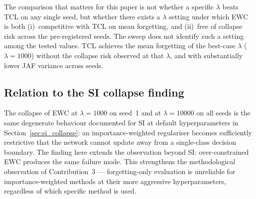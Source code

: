 The comparison that matters for this paper is not whether a specific
$\lambda$ beats TCL on any single seed, but whether there exists a
$\lambda$ setting under which EWC is both
(i)~competitive with TCL on mean forgetting, and
(ii)~free of collapse risk across the pre-registered seeds.
The sweep does not identify such a setting among the tested values.
TCL achieves the mean forgetting of the best-case $\lambda$
($\lambda=1000$) without the collapse risk observed at that $\lambda$,
and with substantially lower JAF variance across seeds.

\subsection{Relation to the SI collapse finding}

The collapse of EWC at $\lambda=1000$ on seed~1 and at $\lambda=10000$
on all seeds is the same degenerate behaviour documented for SI at
default hyperparameters in Section~\ref{sec:si_collapse}: an
importance-weighted regulariser becomes sufficiently restrictive that
the network cannot update away from a single-class decision boundary.
The finding here extends the observation beyond SI: over-constrained
EWC produces the same failure mode.
This strengthens the methodological observation of
Contribution~3 --- forgetting-only evaluation is unreliable for
importance-weighted methods at their more aggressive hyperparameters,
regardless of which specific method is used.
